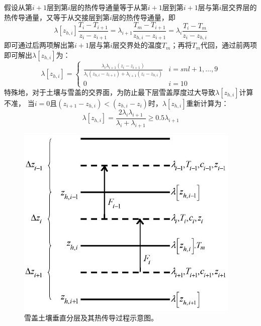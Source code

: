 假设从第$i+1$层到第$i$层的热传导通量等于从第$i+1$层到第$i+1$层与第$i$层交界层的热传导通量，又等于从交接层到第$i$层的热传导通量，即
\begin{equation}
\lambda\left[z_{h, i}\right] \frac{T_{i}-T_{i+1}}{z_{i}-z_{i+1}}=\lambda_{i+1} \frac{T_{m}-T_{i+1}}{z_{h, i}-z_{i+1}}=\lambda_{i} \frac{T_{i}-T_{m}}{z_{i}-z_{h, i}}
\end{equation}
即可通过后两项解出第$i+1$层与第$i$层交界处的温度$T_m$；再将$T_m$代回，通过前两项即可解出$\lambda\left[z_{h,i}\right]$为：
\begin{equation}
\lambda\left[z_{h, i}\right]=\begin{cases}
\frac{\lambda_{i} \lambda_{i+1}\left(z_{i}-z_{i+1}\right)}{\lambda_{i}\left(z_{h, i}-z_{i+1}\right)+\lambda_{i+1}\left(z_{i}-z_{h, i}\right)} & i=snl+1, \ldots, 9 \\ 
0 & i=10
\end{cases}
\end{equation}
特殊地，对于土壤与雪盖的交界面，为防止最下层雪盖厚度过大导致$\lambda\left[z_{h,i}\right]$计算不准，
当$i=0$且$\left(z_{i+1}-z_{h,i}\right)<\left(z_{h,i}-z_i\right)$时，$\lambda\left[z_{h,i}\right]$重新计算为：
\begin{equation}
\lambda\left[z_{h,i}\right]=\frac{2 \lambda_{i} \lambda_{i+1}}{\lambda_{i}+\lambda_{i+1}} \geq 0.5 \lambda_{i+1}
\end{equation}
{
\begin{figure}[htbp]
\centering
\includegraphics{Figures/雪盖土壤热力过程/雪盖土壤垂直分层及其热传导过程示意图.png}
\caption{雪盖土壤垂直分层及其热传导过程示意图。}
\label{fig:雪盖土壤垂直分层及其热传导过程示意图}
\end{figure}
}


